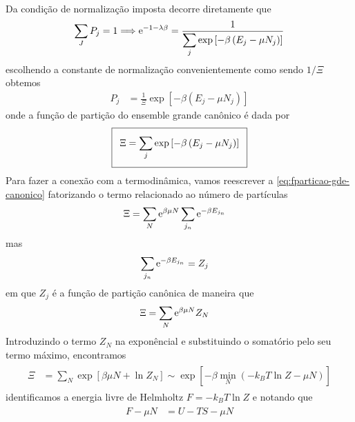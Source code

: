 \begin{prob}
\begin{sol}
\begin{align}
\begin{split}
      \end{split}
    \end{align}
    Da condição de normalização imposta decorre diretamente que
    \begin{align}
      \sum_JP_j=1\Longrightarrow \mathrm{e}^{-1-\lambda\beta}=\frac{1}{\displaystyle\sum_j\exp\left[-\beta\left(E_j-\mu N_j\right)\right]}
    \end{align}
    escolhendo a constante de normalização convenientemente como sendo $1/\Xi$ obtemos
    \begin{align}
      P_j&=\frac{1}{\Xi}\exp\left[-\beta\left(E_j-\mu N_j\right)\right]
    \end{align}
    onde a função de partição do ensemble grande canônico é dada por
    \begin{align}
      \label{eq:fparticao-gde-canonico}
      \addtolength{\fboxsep}{5pt}
      \boxed{
        \begin{gathered}
          \Xi=\sum_j\exp\left[-\beta\left(E_j-\mu N_j\right)\right]
        \end{gathered}
      }      
    \end{align}
    Para fazer a conexão com a termodinâmica, vamos reescrever a \eqref{eq:fparticao-gde-canonico} fatorizando o termo relacionado ao número de partículas
    \begin{align}
      \Xi&=\sum_N\mathrm{e}^{\beta \mu N}\sum_{j_n}\mathrm{e}^{-\beta E_{j_n}}
    \end{align}
    mas
    \begin{align}
      \sum_{j_n}\mathrm{e}^{-\beta E_{j_n}}&=Z_j
    \end{align}
    em que $Z_j$ é a função de partição canônica de maneira que
    \begin{align}
      \Xi&=\sum_N\mathrm{e}^{\beta \mu N}Z_N
    \end{align}
    Introduzindo o termo $Z_N$ na exponêncial e substituindo o somatório pelo seu termo máximo, encontramos
    \begin{align}
      \begin{split}
        \Xi&=\sum_N\exp\left[\beta \mu N+\ln Z_N\right]\sim \exp\left[-\beta\min_N \left(-k_BT\ln Z-\mu N\right)\right]
      \end{split}
    \end{align}
    identificamos a energia livre de Helmholtz $F=-k_BT\ln Z$ e notando que
    \begin{align}
      \begin{split}
        F-\mu N&=U-TS-\mu N\\

\end{split}
\end{align}
\end{sol}
\end{prob}

